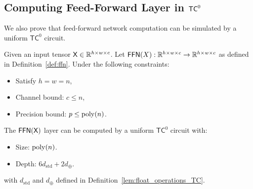 \subsection{Computing Feed-Forward Layer in \texorpdfstring{$\mathsf{TC}^0$}{} }\label{sec:ffn_tc0}
We also prove that feed-forward network computation can be simulated by a uniform $\mathsf{TC}^0$ circuit.
\begin{lemma}\label{lem:ffn_tc0_informal}
 Given an input tensor $\mathsf{X}\in \mathbb{R}^{h \times w \times c}$. Let $\mathsf{FFN}(X):\mathbb{R}^{h \times w \times c} \to \mathbb{R}^{h \times w \times c}$ as defined in Definition~\ref{def:ffn}. Under the following constraints:
 \begin{itemize}
     \item Satisfy $h = w = n$,
         \item Channel bound: $c \leq n$,
         \item Precision bound: $p \leq \operatorname{poly}(n)$.
 \end{itemize}
The $\mathsf{FFN}(\mathsf{X})$ layer can be computed by a uniform $\mathsf{TC}^0$ circuit with:
\begin{itemize}
    \item Size: $\operatorname{poly}(n)$.
    \item Depth: $6d_\mathrm{std} + 2d_{\oplus}$.
\end{itemize}
with $d_{\mathrm{std}}$ and $d_{\oplus}$ defined in Definition~\ref{lem:float_operations_TC}.
\end{lemma}




